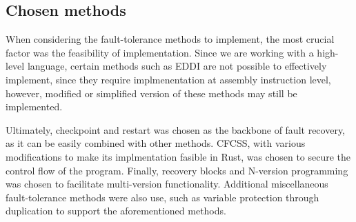 \subsection{Chosen methods}

When considering the fault-tolerance methods to implement, the most crucial factor was the feasibility of implementation. Since we are working with a high-level language, certain methods such as EDDI are not possible to effectively implement, since they require implmenentation at assembly instruction level, however, modified or simplified version of these methods may still be implemented.

Ultimately, checkpoint and restart was chosen as the backbone of fault recovery, as it can be easily combined with other methods. CFCSS, with various modifications to make its implmentation fasible in Rust, was chosen to secure the control flow of the program. Finally, recovery blocks and N-version programming was chosen to facilitate multi-version functionality. Additional miscellaneous fault-tolerance methods were also use, such as variable protection through duplication to support the aforementioned methods.